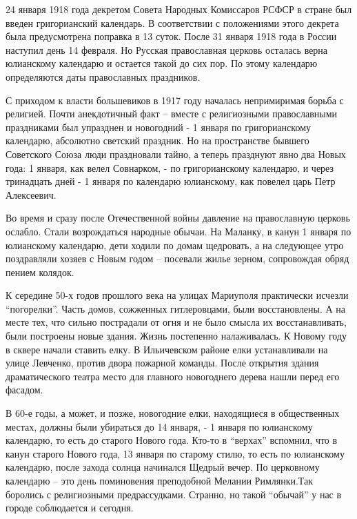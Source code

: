 24 января 1918 года декретом Совета Народных Комиссаров РСФСР в стране был
введен григорианский календарь. В соответствии с положениями этого декрета
была предусмотрена  поправка в 13 суток. После 31 января 1918 года в России
наступил день 14 февраля. Но Русская православная церковь осталась верна
юлианскому календарю и остается такой до сих пор. По этому календарю
определяются даты православных праздников.

С приходом к власти большевиков в 1917 году началась непримиримая борьба  с
религией.  Почти анекдотичный факт – вместе с религиозными православными
праздниками был упразднен и новогодний - 1 января по григорианскому календарю,
абсолютно светский праздник. Но на пространстве бывшего Советского Союза люди
праздновали тайно, а теперь празднуют явно два Новых года: 1 января, как велел
Совнарком, - по григорианскому календарю, и через тринадцать дней - 1 января по
календарю юлианскому, как повелел царь Петр Алексеевич.

Во время и сразу после Отечественной войны давление на православную церковь
ослабло. Стали возрождаться народные обычаи.  На Маланку, в канун 1 января по
юлианскому календарю,  дети ходили по домам щедровать, а на следующее утро
поздравляли хозяев с Новым годом – посевали жилье зерном, сопровождая обряд
пением  колядок.

К середине 50-х годов прошлого века на улицах Мариуполя  практически исчезли
\enquote{погорелки}. Часть  домов, сожженных гитлеровцами, были восстановлены.  А на
месте тех, что сильно пострадали от огня и не было смысла их восстанавливать,
были построены новые здания. Жизнь постепенно налаживалась. К  Новому году в
сквере  начали ставить елку. В Ильичевском районе елки устанавливали на улице
Левченко, против двора пожарной команды. После открытия здания драматического
театра место для главного новогоднего дерева нашли перед его фасадом.

В 60-е годы, а может, и позже,  новогодние елки, находящиеся в общественных
местах,  должны были убираться до 14 января, - 1 января по юлианскому
календарю, то есть до старого Нового года. Кто-то в \enquote{верхах} вспомнил, что в
канун старого Нового года, 13 января по старому стилю, то есть по юлианскому
календарю, после захода солнца начинался Щедрый вечер. По церковному календарю
– это день поминовения преподобной Мелании Римлянки.Так боролись с религиозными
предрассудками. Странно, но такой \enquote{обычай} у нас в городе соблюдается и
сегодня.
